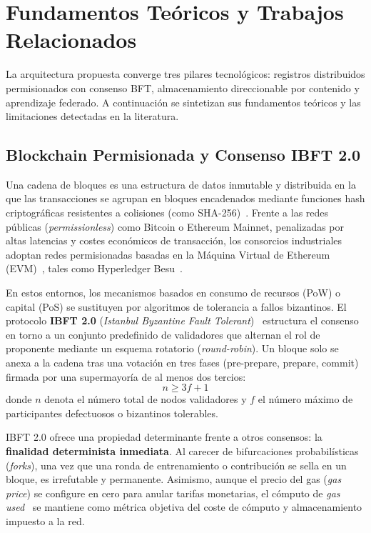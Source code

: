 \section{Fundamentos Teóricos y Trabajos Relacionados}
\label{sec:estado_arte}

La arquitectura propuesta converge tres pilares tecnológicos: registros distribuidos permisionados con consenso BFT, almacenamiento direccionable por contenido y aprendizaje federado. A continuación se sintetizan sus fundamentos teóricos y las limitaciones detectadas en la literatura.

\subsection{Blockchain Permisionada y Consenso IBFT 2.0}
Una cadena de bloques es una estructura de datos inmutable y distribuida en la que las transacciones se agrupan en bloques encadenados mediante funciones hash criptográficas resistentes a colisiones (como SHA-256)~\cite{nist2015sha, zheng2018blockchain}. Frente a las redes públicas (\textit{permissionless}) como Bitcoin o Ethereum Mainnet, penalizadas por altas latencias y costes económicos de transacción, los consorcios industriales adoptan redes permisionadas basadas en la Máquina Virtual de Ethereum (EVM)~\cite{buterin2014ethereum}, tales como Hyperledger Besu~\cite{besu_docs}.

En estos entornos, los mecanismos basados en consumo de recursos (PoW) o capital (PoS) se sustituyen por algoritmos de tolerancia a fallos bizantinos. El protocolo \textbf{IBFT 2.0} (\textit{Istanbul Byzantine Fault Tolerant})~\cite{moniz2020istanbul} estructura el consenso en torno a un conjunto predefinido de validadores que alternan el rol de proponente mediante un esquema rotatorio (\textit{round-robin}). Un bloque solo se anexa a la cadena tras una votación en tres fases (pre-prepare, prepare, commit) firmada por una supermayoría de al menos dos tercios:
\begin{equation}
n \ge 3f + 1
\end{equation}
donde $n$ denota el número total de nodos validadores y $f$ el número máximo de participantes defectuosos o bizantinos tolerables. 

IBFT 2.0 ofrece una propiedad determinante frente a otros consensos: la \textbf{finalidad determinista inmediata}. Al carecer de bifurcaciones probabilísticas (\textit{forks}), una vez que una ronda de entrenamiento o contribución se sella en un bloque, es irrefutable y permanente. Asimismo, aunque el precio del gas (\textit{gas price}) se configure en cero para anular tarifas monetarias, el cómputo de \textit{gas used}~\cite{ethereum_gas} se mantiene como métrica objetiva del coste de cómputo y almacenamiento impuesto a la red.

